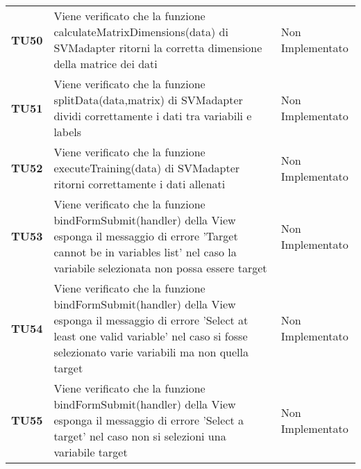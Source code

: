 \documentclass[../piano-di-qualifica.tex]{subfiles}
\begin{document}
\begin{longtable}[H]{>{\centering\bfseries}m{2.5cm} >{\centering}m{7.5cm} >{\centering\arraybackslash}m{3.5cm}}
  \textbf{TU50} & Viene verificato che la funzione calculateMatrixDimensions(data) di SVMadapter ritorni la corretta dimensione della matrice dei dati & Non Implementato \\
  \textbf{TU51} & Viene verificato che la funzione splitData(data,matrix) di SVMadapter dividi correttamente i dati tra variabili e labels & Non Implementato \\
  \textbf{TU52} & Viene verificato che la funzione executeTraining(data) di SVMadapter ritorni correttamente i dati allenati & Non Implementato \\
  \textbf{TU53} & Viene verificato che la funzione bindFormSubmit(handler) della View esponga il messaggio di errore 'Target cannot be in variables list' nel caso la variabile selezionata non possa essere target  & Non Implementato \\
  \textbf{TU54} & Viene verificato che la funzione bindFormSubmit(handler) della View esponga il messaggio di errore 'Select at least one valid variable' nel caso si fosse selezionato varie variabili ma non quella target  & Non Implementato \\
  \textbf{TU55} & Viene verificato che la funzione bindFormSubmit(handler) della View esponga il messaggio di errore 'Select a target' nel caso non si selezioni una variabile target  & Non Implementato \\
\end{longtable}
\end{document}

